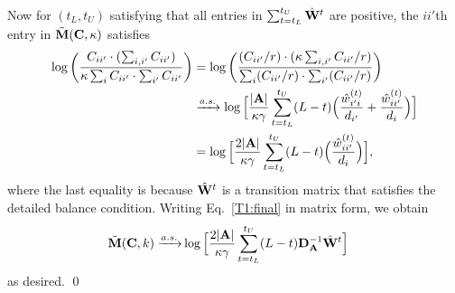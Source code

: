 \documentclass[10pt,journal,compsoc]{IEEEtran}
\newcommand{\ee}{\end{aligned} \end{equation}}
\newcommand{\bee}{\begin{equation}\begin{aligned}}
\newcommand{\M}[1]{{{\mathbf{\MakeUppercase{#1}}}}}
\numberwithin{equation}{section}
\begin{document}
Now for $(t_L, t_U)$ satisfying that all entries in $\sum_{t = t_L}^{t_U}\hat{\M W}^t$ are positive, the $ii'$th entry
in $\tilde{\M M}(\M C,\kappa)$ satisfies
\bee\label{T1:final}
\log \left(\frac{C_{ii'} \cdot(\sum_{i,i'}C_{ii'})}{\kappa \sum_{i}C_{ii'} \cdot \sum_{i'}C_{ii'}}\right)
&= \log \left(\frac{(C_{ii'}/r)\cdot(\kappa \sum_{i,i'}C_{ii'}/r)}{\sum_{i}(C_{ii'}/r) \cdot \sum_{i'}(C_{ii'}/r)}\right) 
\\
&\xrightarrow{a.s.}\log\Big[\frac{|\M A|}{\kappa \gamma}\sum_{t = t_L}^{t_U}(L -t)\Big(\frac{\hat{w}^{(t)}_{i'i}}{d_{i'}}+\frac{\hat{w}_{ii'}^{(t)}}{d_i}\Big)\Big] 
\\
&=\log\Big[\frac{2|\M A|}{\kappa \gamma}\sum_{t = t_L}^{t_U}(L - t)\Big(\frac{\hat{w}_{ii'}^{(t)}}{d_i}\Big)\Big],
\ee
where the last equality is because $\hat{\M W}^{t}$ is a
transition matrix that satisfies the detailed balance
condition. Writing Eq.~\eqref{T1:final} in matrix form, we obtain 
\bee\nonumber
\tilde{\M M}(\M C,k) \xrightarrow{a.s.} &\log\Big[\frac{2|\M A|}{\kappa \gamma} \sum_{t = t_L}^{t_U}(L - t)\M D_{\M A}^{-1}\hat{\M W}^t\Big] 
\ee 
as desired.
\qed
\end{document}

